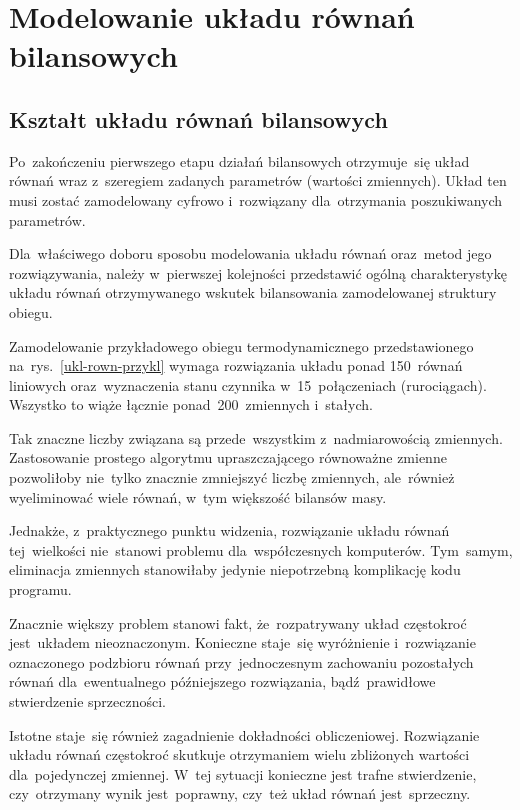 \section{Modelowanie układu równań bilansowych}

\subsection{Kształt układu równań bilansowych}

Po~zakończeniu pierwszego etapu działań bilansowych otrzymuje~się układ
równań wraz z~szeregiem zadanych parametrów (wartości zmiennych). Układ
ten musi zostać zamodelowany cyfrowo i~rozwiązany dla~otrzymania
poszukiwanych parametrów.

Dla~właściwego doboru sposobu modelowania układu równań oraz~metod jego
rozwiązywania, należy w~pierwszej kolejności przedstawić ogólną
charakterystykę układu równań otrzymywanego wskutek bilansowania
zamodelowanej struktury obiegu.



Zamodelowanie przykładowego obiegu termodynamicznego przedstawionego
na~rys.~\ref{ukl-rown-przykl} wymaga rozwiązania układu ponad 150~równań
liniowych oraz~wyznaczenia stanu czynnika w~15~połączeniach
(rurociągach). Wszystko to wiąże łącznie ponad~200~zmiennych i~stałych.

Tak znaczne liczby związana są przede~wszystkim z~nadmiarowością
zmiennych. Zastosowanie prostego algorytmu upraszczającego równoważne
zmienne pozwoliłoby nie~tylko znacznie zmniejszyć liczbę zmiennych,
ale~również wyeliminować wiele równań, w~tym większość bilansów masy.

Jednakże, z~praktycznego punktu widzenia, rozwiązanie układu równań
tej~wielkości nie~stanowi problemu dla~współczesnych komputerów.
Tym~samym, eliminacja zmiennych stanowiłaby jedynie niepotrzebną
komplikację kodu programu.

Znacznie większy problem stanowi fakt, że~rozpatrywany układ częstokroć
jest~układem nieoznaczonym. Konieczne staje~się wyróżnienie
i~rozwiązanie oznaczonego podzbioru równań przy~jednoczesnym zachowaniu
pozostałych równań dla~ewentualnego późniejszego rozwiązania,
bądź~prawidłowe stwierdzenie sprzeczności.

Istotne staje~się również zagadnienie dokładności obliczeniowej.
Rozwiązanie układu równań częstokroć skutkuje otrzymaniem wielu
zbliżonych wartości dla~pojedynczej zmiennej. W~tej sytuacji konieczne
jest trafne stwierdzenie, czy~otrzymany wynik jest~poprawny, czy~też
układ równań jest~sprzeczny.


